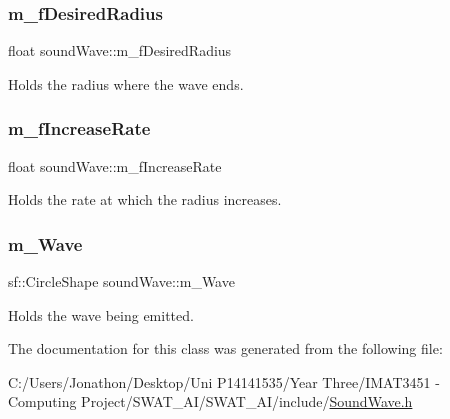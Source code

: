 \mbox{\label{classsound_wave_ac9adfa989210e9baa9ac4aab9a31309a}} 
\subsubsection{\texorpdfstring{m\+\_\+f\+Desired\+Radius}{m\_fDesiredRadius}}
{\footnotesize\ttfamily float sound\+Wave\+::m\+\_\+f\+Desired\+Radius\hspace{0.3cm}{\ttfamily [private]}}



Holds the radius where the wave ends. 

\mbox{\label{classsound_wave_a6fa457d0d462e86c6be2d36695f9270d}} 
\subsubsection{\texorpdfstring{m\+\_\+f\+Increase\+Rate}{m\_fIncreaseRate}}
{\footnotesize\ttfamily float sound\+Wave\+::m\+\_\+f\+Increase\+Rate\hspace{0.3cm}{\ttfamily [private]}}



Holds the rate at which the radius increases. 

\mbox{\label{classsound_wave_aeb2707ab18aac662ee8ce8eca9297378}} 
\subsubsection{\texorpdfstring{m\+\_\+\+Wave}{m\_Wave}}
{\footnotesize\ttfamily sf\+::\+Circle\+Shape sound\+Wave\+::m\+\_\+\+Wave\hspace{0.3cm}{\ttfamily [private]}}



Holds the wave being emitted. 



The documentation for this class was generated from the following file\+:\begin{DoxyCompactItemize}
\item 
C\+:/\+Users/\+Jonathon/\+Desktop/\+Uni P14141535/\+Year Three/\+I\+M\+A\+T3451 -\/ Computing Project/\+S\+W\+A\+T\+\_\+\+A\+I/\+S\+W\+A\+T\+\_\+\+A\+I/include/\hyperlink{_sound_wave_8h}{Sound\+Wave.\+h}\end{DoxyCompactItemize}
